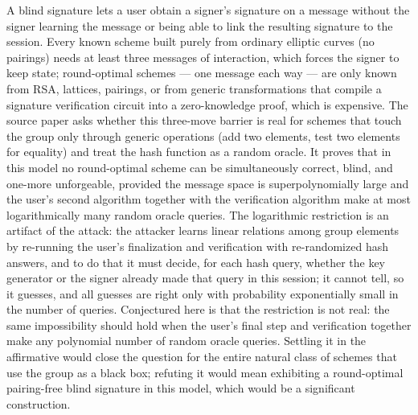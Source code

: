 \documentclass{conjura-conjecture}
\begin{document}

\vspace{0.4em}

\begin{informalconjecture}
A blind signature lets a user obtain a signer's signature on a message
without the signer learning the message or being able to link the
resulting signature to the session. Every known scheme built purely
from ordinary elliptic curves (no pairings) needs at least three
messages of interaction, which forces the signer to keep state;
round-optimal schemes --- one message each way --- are only known from
RSA, lattices, pairings, or from generic transformations that compile a
signature verification circuit into a zero-knowledge proof, which is
expensive. The source paper asks whether this three-move barrier is
real for schemes that touch the group only through generic operations
(add two elements, test two elements for equality) and treat the hash
function as a random oracle. It proves that in this model no
round-optimal scheme can be simultaneously correct, blind, and one-more
unforgeable, provided the message space is superpolynomially large and
the user's second algorithm together with the verification algorithm
make at most logarithmically many random oracle queries. The
logarithmic restriction is an artifact of the attack: the attacker
learns linear relations among group elements by re-running the user's
finalization and verification with re-randomized hash answers, and to
do that it must decide, for each hash query, whether the key generator
or the signer already made that query in this session; it cannot tell,
so it guesses, and all guesses are right only with probability
exponentially small in the number of queries. Conjectured here is that
the restriction is not real: the same impossibility should hold when
the user's final step and verification together make any polynomial
number of random oracle queries. Settling it in the affirmative would
close the question for the entire natural class of schemes that use the
group as a black box; refuting it would mean exhibiting a round-optimal
pairing-free blind signature in this model, which would be a
significant construction.
\end{informalconjecture}
\end{document}
